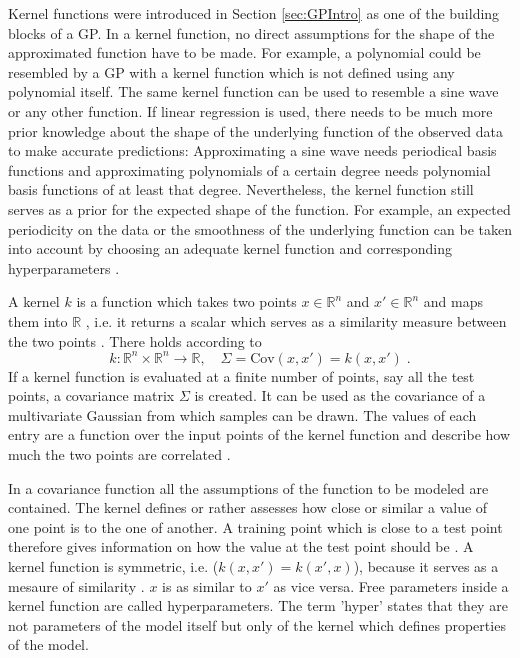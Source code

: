 \documentclass[%
  a4paper,oneside,%
  11pt,%
  smallchapters,
  style=printdev,
  extramargin,
  green,%
  rgb, <cmyk>
  ]{tubsbook}
\begin{document}
Kernel functions were introduced in Section \ref{sec:GPIntro} as one of the building blocks of a GP. 
In a kernel function, no direct assumptions for the shape of the approximated function have to be made. For example, a polynomial could be resembled by a GP with a kernel function which is not defined using any polynomial itself. The same kernel function can be used to resemble a sine wave or any other function. If linear regression is used, there needs to be much more prior knowledge about the shape of the underlying function of the observed data to make accurate predictions: Approximating a sine wave needs periodical basis functions and approximating polynomials of a certain degree needs polynomial basis functions of at least that degree. Nevertheless, the kernel function still serves as a prior for the expected shape of the function. For example, an expected periodicity on the data or the smoothness of the underlying function can be taken into account by choosing an adequate kernel function and corresponding hyperparameters \cite{rasmussen2006}.

A kernel $k$ is a function which takes two points $x \in \mathbb{R}^n$ and $x' \in \mathbb{R}^n$ and maps them into $\mathbb{R}$ \cite[p.80]{rasmussen2006}, i.e. it returns a scalar which serves as a similarity measure between the two points \cite{gortler2019}. There holds according to \cite{gortler2019}
%
\begin{equation}
k: \mathbb{R}^n \times \mathbb{R}^n \to \mathbb{R}, \quad \Sigma = \mathrm{Cov}(x,x') = k(x,x') \;.
\end{equation}
%
If a kernel function is evaluated at a finite number of points, say all the test points, a covariance matrix $\Sigma$ is created. It can be used as the covariance of a multivariate Gaussian from which samples can be drawn. The values of each entry are a function over the input points of the kernel function and describe how much the two points are correlated \cite[p.14]{rasmussen2006}. 

In a covariance function all the assumptions of the function to be modeled are contained. The kernel defines or rather assesses how close or similar a value of one point is to the one of another. A training point which is close to a test point therefore gives information on how the value at the test point should be \cite[p.79]{rasmussen2006}. 
A kernel function is symmetric, i.e. ($k(x,x') = k(x',x)$), because it serves as a mesaure of similarity \cite[p.481]{murphy2012}. $x$ is as similar to $x'$ as vice versa.
Free parameters inside a kernel function are called hyperparameters. The term 'hyper' states that they are not parameters of the model itself but only of the kernel which defines properties of the model.
\end{document}
